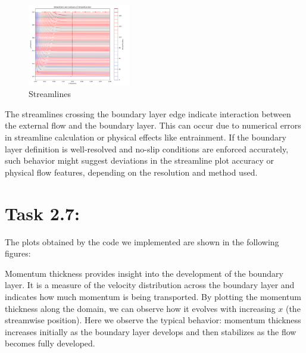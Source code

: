 \documentclass{article}
\begin{document}
\begin{figure}[h!]
  \centering
  \includegraphics[width=0.4\textwidth]{task_2_6_fixed.png}
  \caption{Streamlines}
\end{figure}
The streamlines crossing the boundary layer edge indicate interaction between the external flow and the boundary layer. This can occur due to numerical errors in streamline calculation or physical effects like entrainment. If the boundary layer definition is well-resolved and no-slip conditions are enforced accurately, such behavior might suggest deviations in the streamline plot accuracy or physical flow features, depending on the resolution and method used.


\section*{\Large Task 2.7:}
The plots obtained by the code we implemented are shown in the following figures:
\begin{figure}[h]
\centering
{}
\hfill
{}
\label{fig:mieiduetrasparenti}
\end{figure}
Momentum thickness provides insight into the development of the boundary layer. It is a measure of the velocity distribution across the boundary layer and indicates how much momentum is being transported.
By plotting the momentum thickness along the domain, we can observe how it evolves with increasing $x$ (the streamwise position). Here we observe the typical behavior: momentum thickness increases initially as the boundary layer develops and then stabilizes as the flow becomes fully developed.
\end{document}
